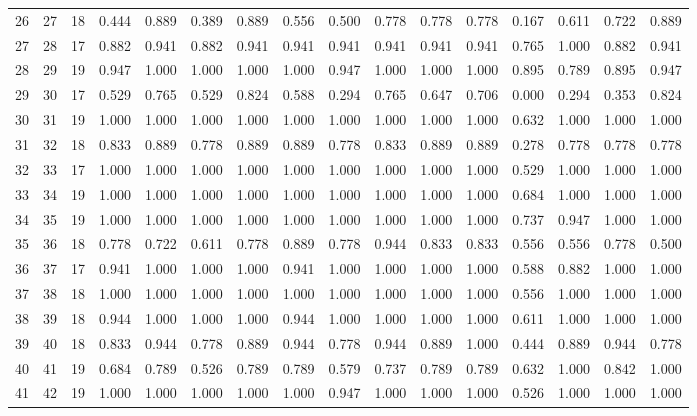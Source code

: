 \begin{longtable}{lrllllllllllllll}
26 & 27 & 18 & 0.444 & 0.889 & 0.389 & 0.889 & 0.556 & 0.500 & 0.778 & 0.778 & 0.778 & 0.167 & 0.611 & 0.722 & 0.889 \\
27 & 28 & 17 & 0.882 & 0.941 & 0.882 & 0.941 & 0.941 & 0.941 & 0.941 & 0.941 & 0.941 & 0.765 & 1.000 & 0.882 & 0.941 \\
28 & 29 & 19 & 0.947 & 1.000 & 1.000 & 1.000 & 1.000 & 0.947 & 1.000 & 1.000 & 1.000 & 0.895 & 0.789 & 0.895 & 0.947 \\
29 & 30 & 17 & 0.529 & 0.765 & 0.529 & 0.824 & 0.588 & 0.294 & 0.765 & 0.647 & 0.706 & 0.000 & 0.294 & 0.353 & 0.824 \\
30 & 31 & 19 & 1.000 & 1.000 & 1.000 & 1.000 & 1.000 & 1.000 & 1.000 & 1.000 & 1.000 & 0.632 & 1.000 & 1.000 & 1.000 \\
31 & 32 & 18 & 0.833 & 0.889 & 0.778 & 0.889 & 0.889 & 0.778 & 0.833 & 0.889 & 0.889 & 0.278 & 0.778 & 0.778 & 0.778 \\
32 & 33 & 17 & 1.000 & 1.000 & 1.000 & 1.000 & 1.000 & 1.000 & 1.000 & 1.000 & 1.000 & 0.529 & 1.000 & 1.000 & 1.000 \\
33 & 34 & 19 & 1.000 & 1.000 & 1.000 & 1.000 & 1.000 & 1.000 & 1.000 & 1.000 & 1.000 & 0.684 & 1.000 & 1.000 & 1.000 \\
34 & 35 & 19 & 1.000 & 1.000 & 1.000 & 1.000 & 1.000 & 1.000 & 1.000 & 1.000 & 1.000 & 0.737 & 0.947 & 1.000 & 1.000 \\
35 & 36 & 18 & 0.778 & 0.722 & 0.611 & 0.778 & 0.889 & 0.778 & 0.944 & 0.833 & 0.833 & 0.556 & 0.556 & 0.778 & 0.500 \\
36 & 37 & 17 & 0.941 & 1.000 & 1.000 & 1.000 & 0.941 & 1.000 & 1.000 & 1.000 & 1.000 & 0.588 & 0.882 & 1.000 & 1.000 \\
37 & 38 & 18 & 1.000 & 1.000 & 1.000 & 1.000 & 1.000 & 1.000 & 1.000 & 1.000 & 1.000 & 0.556 & 1.000 & 1.000 & 1.000 \\
38 & 39 & 18 & 0.944 & 1.000 & 1.000 & 1.000 & 0.944 & 1.000 & 1.000 & 1.000 & 1.000 & 0.611 & 1.000 & 1.000 & 1.000 \\
39 & 40 & 18 & 0.833 & 0.944 & 0.778 & 0.889 & 0.944 & 0.778 & 0.944 & 0.889 & 1.000 & 0.444 & 0.889 & 0.944 & 0.778 \\
40 & 41 & 19 & 0.684 & 0.789 & 0.526 & 0.789 & 0.789 & 0.579 & 0.737 & 0.789 & 0.789 & 0.632 & 1.000 & 0.842 & 1.000 \\
41 & 42 & 19 & 1.000 & 1.000 & 1.000 & 1.000 & 1.000 & 0.947 & 1.000 & 1.000 & 1.000 & 0.526 & 1.000 & 1.000 & 1.000 \\
\end{longtable}
